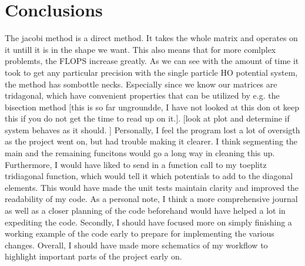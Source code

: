 \documentclass[10pt, twocolumn]{article}
\begin{document}
\section{Conclusions}
The jacobi method is a direct method. It takes the whole matrix and operates on it untill it is in the shape we want. 
This also means that for more comlplex problemts, the FLOPS increase greatly. As we can see with the amount of time it took to get any 
particular precision with the single particle HO potential system, the method has sombottle necks.  Especially since we know our 
matrices are tridagonal, which have convenient properties that can be utilized by e.g. the bisection method [this is so far 
ungroundde, I have not looked at this don ot keep this if you do not get the time to read up on it.].
[look at plot and determine if system behaves as it should. ]
Personally, I feel the program lost a lot of oversigth as the project went on, but had trouble making it clearer. I think segmenting 
the main and the remaining funcitons would go a long way in cleaning this up. Furthermore, I would have liked to send in a function call to 
my toeplitz tridiagonal function, which would tell it which potentials to add to the diagonal elements. This would have made the unit 
tests maintain clarity and improved the readability of my code. As a personal note, I think a more comprehensive journal as well as a 
closer planning of the code beforehand would have helped a lot in expediting the code. Secondly, I should have focused more on simply 
finishing a working example of the code early to prepare for implementing the various changes. Overall, I should have made more 
schematics of my workflow to highlight important parts of the project early on.



\end{document}
